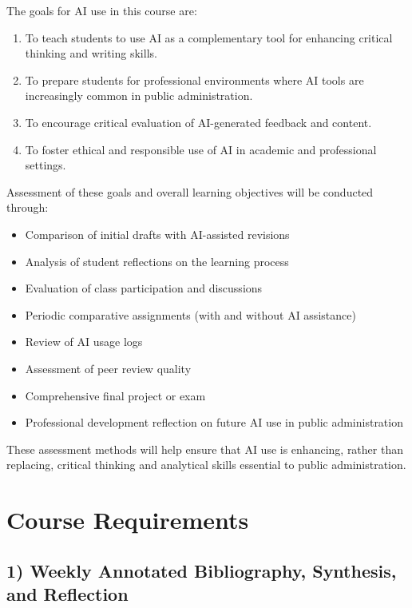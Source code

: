 \documentclass[12pt, letterpaper]{article}
\begin{document}
\noindent The goals for AI use in this course are:

\begin{enumerate}
    \item To teach students to use AI as a complementary tool for enhancing critical thinking and writing skills.
    \item To prepare students for professional environments where AI tools are increasingly common in public administration.
    \item To encourage critical evaluation of AI-generated feedback and content.
    \item To foster ethical and responsible use of AI in academic and professional settings.
\end{enumerate}

\noindent Assessment of these goals and overall learning objectives will be conducted through:

\begin{itemize}
    \item Comparison of initial drafts with AI-assisted revisions
    \item Analysis of student reflections on the learning process
    \item Evaluation of class participation and discussions
    \item Periodic comparative assignments (with and without AI assistance)
    \item Review of AI usage logs
    \item Assessment of peer review quality
    \item Comprehensive final project or exam
    \item Professional development reflection on future AI use in public administration
\end{itemize}

\noindent These assessment methods will help ensure that AI use is enhancing, rather than replacing, critical thinking and analytical skills essential to public administration.

\section{Course Requirements}

\subsection*{1) Weekly Annotated Bibliography, Synthesis, and Reflection}
\end{document}
